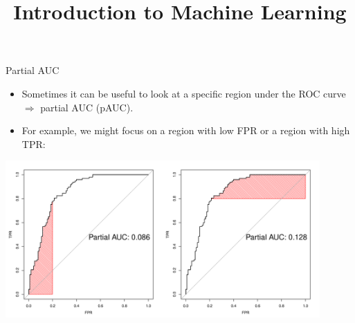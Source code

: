 




\newcommand{\titlefigure}{figure/eval_mclass_roc_sp_13}
\newcommand{\learninggoals}{
\item Understand why pAUC is a reasonable metric in some contexts
\item Know how pAUC is computed and normalized
\item Understand multi-class AUC}


\title{Introduction to Machine Learning}
\date{}



\sloppy


\begin{vbframe}{Partial AUC}

\begin{itemize}
  \item Sometimes it can be useful to look at a specific region under the ROC
  curve $\Rightarrow$ partial AUC (pAUC).
  \item For example, we might focus on a region with low FPR or a region with
  high TPR:
\end{itemize}

\begin{knitrout}\scriptsize
{}\color{fgcolor}
{\centering \includegraphics[width=0.9\textwidth]{figure/eval_mclass_roc_sp_13}}
\end{knitrout}

\end{vbframe}

